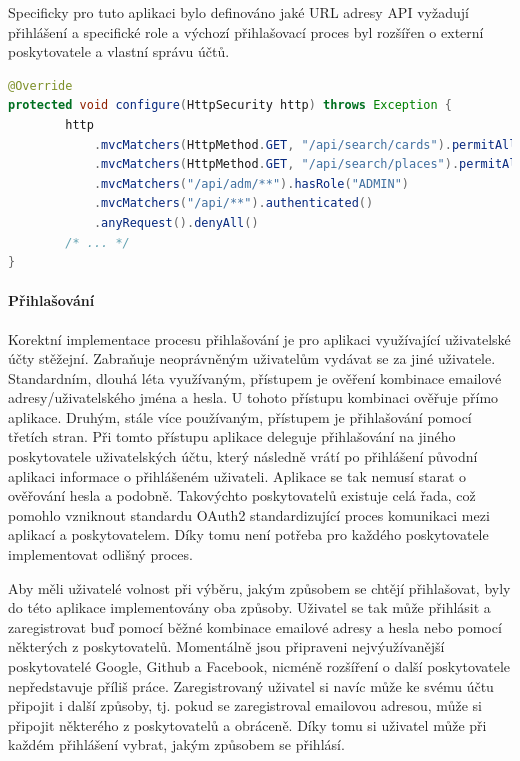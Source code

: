 			Specificky pro tuto aplikaci bylo definováno jaké \ac{URL} adresy \ac{API} vyžadují přihlášení a specifické
			role a výchozí přihlašovací proces byl rozšířen o externí poskytovatele a vlastní správu účtů.

			\begin{lstlisting}[language=Java, caption={Ukázka části nastavení zabezpečení API pomocí knihovny Spring Security. Zdroj: [autor]}]
@Override
protected void configure(HttpSecurity http) throws Exception {
        http
            .mvcMatchers(HttpMethod.GET, "/api/search/cards").permitAll()
            .mvcMatchers(HttpMethod.GET, "/api/search/places").permitAll()
            .mvcMatchers("/api/adm/**").hasRole("ADMIN")
            .mvcMatchers("/api/**").authenticated()
            .anyRequest().denyAll()
        /* ... */
}
			\end{lstlisting}

			\paragraph{Přihlašování}

			Korektní implementace procesu přihlašování je pro aplikaci využívající uživatelské účty stěžejní.
			Zabraňuje neoprávněným uživatelům vydávat se za jiné uživatele.
			Standardním, dlouhá léta využívaným, přístupem je ověření kombinace emailové adresy/uživatelského jména
			a hesla.
			U tohoto přístupu kombinaci ověřuje přímo aplikace.
			Druhým, stále více používaným, přístupem je přihlašování pomocí třetích stran.
			Při tomto přístupu aplikace deleguje přihlašování na jiného poskytovatele uživatelských účtu, který následně
			vrátí po přihlášení původní aplikaci informace o přihlášeném uživateli.
			Aplikace se tak nemusí starat o ověřování hesla a podobně.
			Takovýchto poskytovatelů existuje celá řada, což pomohlo vzniknout standardu OAuth2 standardizující proces
			komunikaci mezi aplikací a poskytovatelem.
			Díky tomu není potřeba pro každého poskytovatele implementovat odlišný proces.

			Aby měli uživatelé volnost při výběru, jakým způsobem se chtějí přihlašovat, byly do této aplikace implementovány
			oba způsoby.
			Uživatel se tak může přihlásit a zaregistrovat buď pomocí běžné kombinace emailové adresy a hesla nebo pomocí
			některých z poskytovatelů.
			Momentálně jsou připraveni nejvýužívanější poskytovatelé Google, Github a Facebook, nicméně rozšíření o
			další poskytovatele nepředstavuje příliš práce.
			Zaregistrovaný uživatel si navíc může ke svému účtu připojit i další způsoby, tj. pokud se zaregistroval emailovou
			adresou, může si připojit některého z poskytovatelů a obráceně.
			Díky tomu si uživatel může při každém přihlášení vybrat, jakým způsobem se přihlásí.

